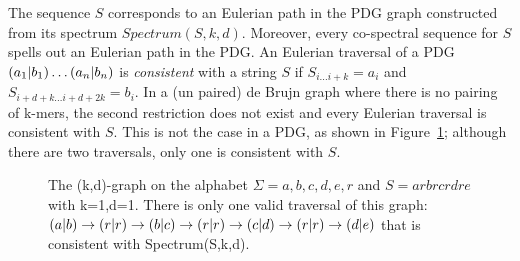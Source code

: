 The sequence $S$ corresponds to an Eulerian path in the PDG graph
constructed from its spectrum $Spectrum(S,k,d)$.  Moreover, every
co-spectral sequence for $S$ spells out an Eulerian path in the PDG.
An Eulerian traversal of a PDG $(a_1 | b_1) \ldots
(a_n | b_n)$ is \textit{consistent} with a string $S$ if
$S_{i\ldots i + k} = a_i$ and $S_{i+d+k \ldots i+d+2k} = b_i$.  In a
(un paired) de Brujn graph where there is no pairing of k-mers, the
second restriction does not exist and every Eulerian traversal is
consistent with $S$.  This is not the case in a PDG, as shown in
Figure~\ref{fig:RepeatKDGraph}; although there are two traversals,
only one is consistent with $S$. 


\begin{figure}
\begin{center}
\end{center}
\caption{The (k,d)-graph on the alphabet $\Sigma = {a,b,c,d,e,r}$ and
  $S = arbrcrdre$ with k=1,d=1.  There is only one valid traversal of
  this graph: $(a | b) \rightarrow (r | r) \rightarrow
  (b | c) \rightarrow (r | r) \rightarrow (c | d)
  \rightarrow (r | r) \rightarrow (d | e)$
  that is consistent with Spectrum(S,k,d).}
\label{fig:RepeatKDGraph}
\end{figure}
 
